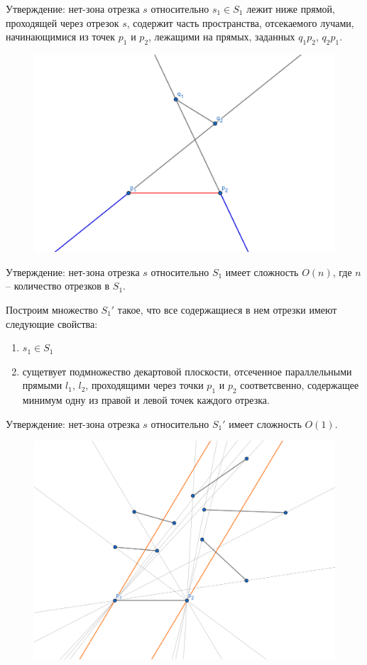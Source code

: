 \documentclass[letterpaper,12pt]{article}
\begin{document}
Утверждение: нет-зона отрезка $s$ относительно $s_1 \in S_1$
лежит ниже прямой, проходящей через отрезок $s$, содержит часть
пространства, отсекаемого лучами, начинающимися из точек 
$p_1$ и $p_2$, лежащими на прямых, заданных $q_1 p_2$, $q_2 p_1$.

\begin{figure}[H]
      \centering
      \includegraphics[width=0.5\linewidth]{no_zone_s1.png}
\end{figure}

Утверждение: нет-зона отрезка $s$ относительно $S_1$ имеет
сложность $O(n)$, где $n$ -- количество отрезков в $S_1$.

Построим множество ${S_1}'$ такое, что все содержащиеся в нем
отрезки имеют следующие свойства:

\begin{enumerate}
      \item $s_1 \in S_1$
      \item сущетвует подмножество декартовой плоскости,
            отсеченное параллельными прямыми $l_1$, $l_2$,
            проходящими через точки $p_1$ и $p_2$ соответсвенно,
            содержащее минимум одну из правой и левой точек
            каждого отрезка.
\end{enumerate}

Утверждение: нет-зона отрезка $s$ относительно ${S_1}'$ имеет
сложность $O(1)$.

\begin{figure}[H]
      \centering
      \includegraphics[width=0.5\linewidth]{no_zone_S1_.png}
\end{figure}
\end{document}
